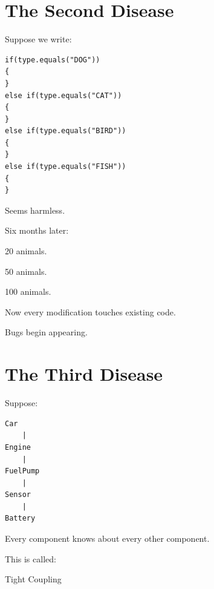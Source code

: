 \documentclass[11pt,a4paper]{book}
\begin{document}
\section{The Second Disease}

Suppose we write:

\begin{verbatim}
if(type.equals("DOG"))
{
}
else if(type.equals("CAT"))
{
}
else if(type.equals("BIRD"))
{
}
else if(type.equals("FISH"))
{
}
\end{verbatim}

Seems harmless.


Six months later:


20 animals.


50 animals.


100 animals.


Now every modification touches
existing code.


Bugs begin appearing.


\section{The Third Disease}

Suppose:

\begin{verbatim}
Car
    |
Engine
    |
FuelPump
    |
Sensor
    |
Battery
\end{verbatim}

Every component knows
about every other component.


This is called:


Tight Coupling

\end{document}
